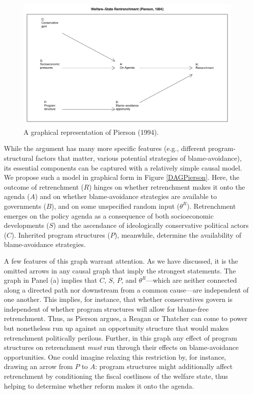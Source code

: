 \documentclass[
  12pt,
]{book}
\begin{document}
\begin{figure}

{\centering \includegraphics[width=.7\textwidth]{ii_files/figure-latex/pierson-1} 

}

\caption{\label{fig:DAGPierson} A graphical representation of Pierson (1994).}\label{fig:pierson}
\end{figure}

While the argument has many more specific features (e.g., different program-structural factors that matter, various potential strategies of blame-avoidance), its essential components can be captured with a relatively simple causal model. We propose such a model in graphical form in Figure \ref{DAGPierson}. Here, the outcome of retrenchment (\(R\)) hinges on whether retrenchment makes it onto the agenda (\(A\)) and on whether blame-avoidance strategies are available to governments (\(B\)), and on some unspecified random input (\(\theta^R\)). Retrenchment emerges on the policy agenda as a consequence of both socioeconomic developments (\(S\)) and the ascendance of ideologically conservative political actors (\(C\)). Inherited program structures (\(P\)), meanwhile, determine the availability of blame-avoidance strategies.

A few features of this graph warrant attention. As we have discussed, it is the omitted arrows in any causal graph that imply the strongest statements. The graph in Panel (a) implies that \(C\), \(S\), \(P\), and \(\theta^R\)---which are neither connected along a directed path nor downstream from a common cause---are independent of one another. This implies, for instance, that whether conservatives govern is independent of whether program structures will allow for blame-free retrenchment. Thus, as Pierson argues, a Reagan or Thatcher can come to power but nonetheless run up against an opportunity structure that would makes retrenchment politically perilous. Further, in this graph any effect of program structures on retrenchment \emph{must} run through their effects on blame-avoidance opportunities. One could imagine relaxing this restriction by, for instance, drawing an arrow from \(P\) to \(A\): program structures might additionally affect retrenchment by conditioning the fiscal costliness of the welfare state, thus helping to determine whether reform makes it onto the agenda.
\end{document}
